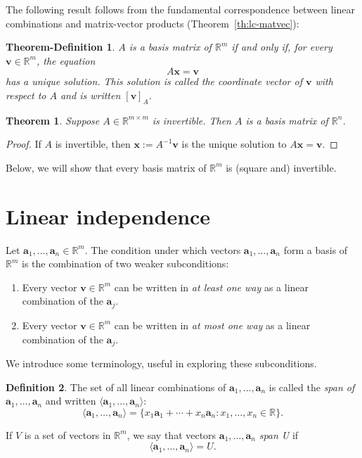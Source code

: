 \documentclass[12pt]{amsart}
\newcommand{\RR}{\mathbb{R}}
\newtheorem{theorem}{Theorem}[section]
\newtheorem{thdf}{Theorem-Definition}[section]
\theoremstyle{definition}
\newtheorem{definition}[theorem]{Definition}
\newcommand{\ba}{\mathbf{a}}
\newcommand{\bv}{\mathbf{v}}
\newcommand{\bx}{\mathbf{x}}
\newcommand{\bas}{\ba_1,\ldots,\ba_n}
\begin{document}
The following result follows from the fundamental correspondence between
linear combinations and matrix-vector products (Theorem~\ref{th:lc-matvec}): 

\begin{thdf}
	$A$ is a basis matrix of $\RR^m$ if and only if, for every $\bv\in \RR^m$,
	the equation
	\begin{equation}\label{eq:axv}
		A\bx=\bv
	\end{equation}
	has a unique solution. This solution is called the \emph{coordinate vector of $\bv$ with respect to $A$}
	and is written $[\bv]_A$.
\end{thdf}

\begin{theorem}\label{th:invertible_mats_are_basis_mats}
	Suppose $A\in\RR^{m\times m}$ is invertible.
	Then $A$ is a basis matrix of $\RR^n$.
\end{theorem}

\begin{proof}
	If $A$ is invertible, then $\bx:=A^{-1}\bv$ is the unique solution to $A\bx=\bv$.
\end{proof}

Below, we will show that every basis matrix of $\RR^m$ is (square and) invertible.

\section{Linear independence}

Let $\bas\in\RR^m$.
The condition under which vectors $\bas$ form a basis of $\RR^m$ is the combination of two weaker subconditions:
\begin{enumerate}
	\item Every vector $\bv\in \RR^m$ can be written in \emph{at least one way} as a linear combination of the $\ba_j$.
	\item Every vector $\bv\in \RR^m$ can be written in \emph{at most one way} as a linear combination of the $\ba_j$.
\end{enumerate}
We introduce some terminology, useful in exploring these subconditions.
\begin{definition}\label{df:span}
	The set of all linear combinations of $\ba_1,\ldots,\ba_n$ is called the
	\emph{span of $\ba_1,\ldots,\ba_n$} and written
	$\langle \ba_1,\ldots,\ba_n\rangle$:
	\[
		\langle \ba_1,\ldots,\ba_n\rangle 
		= \{x_1\ba_1+\cdots + x_n\ba_n : x_1,\ldots,x_n\in\RR\}.
	\]

	If $V$ is a set of vectors in $\RR^m$, we say that vectors $\ba_1,\ldots,\ba_n$
	\emph{span U} if
	\[
		\langle \ba_1,\ldots,\ba_n\rangle = U.
	\]
\end{definition}
\end{document}
